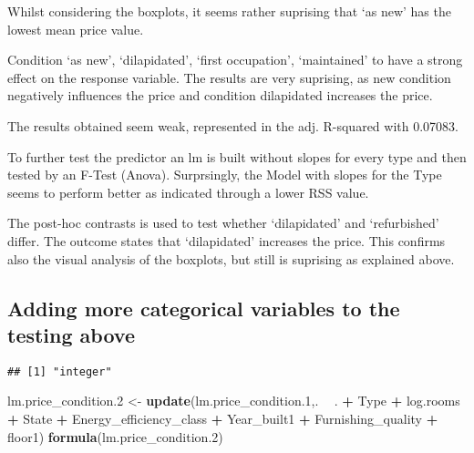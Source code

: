 \documentclass[
]{article}
\newenvironment{Shaded}{\begin{snugshade}}{\end{snugshade}}
\newcommand{\FloatTok}[1]{\textcolor[rgb]{0.00,0.00,0.81}{#1}}
\newcommand{\KeywordTok}[1]{\textcolor[rgb]{0.13,0.29,0.53}{\textbf{#1}}}
\newcommand{\NormalTok}[1]{#1}
\newcommand{\OperatorTok}[1]{\textcolor[rgb]{0.81,0.36,0.00}{\textbf{#1}}}
\newcommand{\StringTok}[1]{\textcolor[rgb]{0.31,0.60,0.02}{#1}}
\begin{document}
Whilst considering the boxplots, it seems rather suprising that `as new'
has the lowest mean price value.

Condition `as new', `dilapidated', `first occupation', `maintained' to
have a strong effect on the response variable. The results are very
suprising, as new condition negatively influences the price and
condition dilapidated increases the price.

The results obtained seem weak, represented in the adj. R-squared with
0.07083.

To further test the predictor an lm is built without slopes for every
type and then tested by an F-Test (Anova). Surprsingly, the Model with
slopes for the Type seems to perform better as indicated through a lower
RSS value.

The post-hoc contrasts is used to test whether `dilapidated' and
`refurbished' differ. The outcome states that `dilapidated' increases
the price. This confirms also the visual analysis of the boxplots, but
still is suprising as explained above.

\hypertarget{adding-more-categorical-variables-to-the-testing-above}{%
\subsection{Adding more categorical variables to the testing
above}\label{adding-more-categorical-variables-to-the-testing-above}}

\begin{Shaded}
\end{Shaded}

\begin{verbatim}
## [1] "integer"
\end{verbatim}

\begin{Shaded}
\begin{Highlighting}[]
\NormalTok{lm.price_condition}\FloatTok{.2}\NormalTok{ <-}\StringTok{ }\KeywordTok{update}\NormalTok{(lm.price_condition}\FloatTok{.1}\NormalTok{,. }\OperatorTok{~}\StringTok{ }\NormalTok{. }\OperatorTok{+}\StringTok{ }\NormalTok{Type }\OperatorTok{+}\StringTok{ }\NormalTok{log.rooms }\OperatorTok{+}
\StringTok{                                 }\NormalTok{State }\OperatorTok{+}\StringTok{ }\NormalTok{Energy_efficiency_class }\OperatorTok{+}\StringTok{ }\NormalTok{Year_built1 }\OperatorTok{+}\StringTok{ }\NormalTok{Furnishing_quality }\OperatorTok{+}\StringTok{ }\NormalTok{floor1)}
\KeywordTok{formula}\NormalTok{(lm.price_condition}\FloatTok{.2}\NormalTok{)}
\end{Highlighting}
\end{Shaded}
\end{document}
